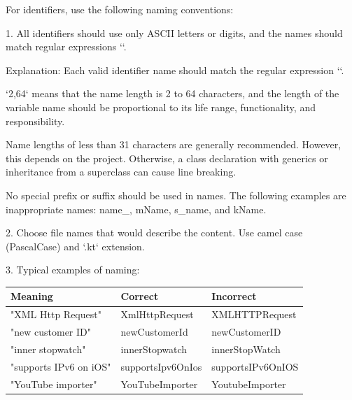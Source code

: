 For identifiers, use the following naming conventions:

1.	All identifiers should use only ASCII letters or digits, and the names should match regular expressions ``.

Explanation: Each valid identifier name should match the regular expression ``.

`{2,64}` means that the name length is 2 to 64 characters, and the length of the variable name should be proportional to its life range, functionality, and responsibility.

Name lengths of less than 31 characters are generally recommended. However, this depends on the project. Otherwise, a class declaration with generics or inheritance from a superclass can cause line breaking.

No special prefix or suffix should be used in names. The following examples are inappropriate names: name\_, mName, s\_name, and kName.



2.	Choose file names that would describe the content. Use camel case (PascalCase) and `.kt` extension.



3.	Typical examples of naming:



\begin{center}

\begin{tabular}{ |p{}|p{}|p{}| }

\hline

Meaning&Correct&Incorrect\\

\hline

 "XML Http Request" & XmlHttpRequest & XMLHTTPRequest \\

 "new customer ID" & newCustomerId & newCustomerID \\

 "inner stopwatch" & innerStopwatch & innerStopWatch \\

 "supports IPv6 on iOS" & supportsIpv6OnIos & supportsIPv6OnIOS \\

 "YouTube importer" & YouTubeImporter & YoutubeImporter \\

\hline

\end{tabular}

\end{center}

